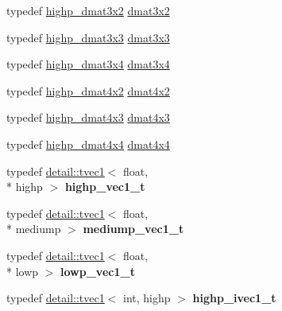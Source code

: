 \begin{DoxyCompactItemize}
\item 
typedef \hyperlink{group__core__precision_gac956fe6b946f0ccee78367ccd5427351}{highp\-\_\-dmat3x2} \hyperlink{group__core__types_ga2db259d2e7921065c5b7d4dca9547960}{dmat3x2}
\item 
typedef \hyperlink{group__core__precision_gad7229dea82287910d88e6e8566e39fc7}{highp\-\_\-dmat3x3} \hyperlink{group__core__types_gaf3c29c4f75a448f308463e75ca2efd4c}{dmat3x3}
\item 
typedef \hyperlink{group__core__precision_gaff199c8d04a8edb92ed43283e8694c59}{highp\-\_\-dmat3x4} \hyperlink{group__core__types_ga19e745a83cba85f57afa1232276dcc96}{dmat3x4}
\item 
typedef \hyperlink{group__core__precision_gaa4fb1ed350a6cd053abb9b093d13ce0d}{highp\-\_\-dmat4x2} \hyperlink{group__core__types_gab3d51ce41e6f0aa267d3e185cee09c44}{dmat4x2}
\item 
typedef \hyperlink{group__core__precision_gaf8aeba0eecc5c651e0f06414b6e37754}{highp\-\_\-dmat4x3} \hyperlink{group__core__types_gaa4a157ac183c5bd5dcbd555a94b1b505}{dmat4x3}
\item 
typedef \hyperlink{group__core__precision_ga1c0a2edbde597b59e9005691a224b208}{highp\-\_\-dmat4x4} \hyperlink{group__core__types_ga54d90d4b902d93638b906571af215bb1}{dmat4x4}
\item 
\hypertarget{namespaceglm_aa500b77d9369f9121bdd014d0e64c4f2}{typedef \hyperlink{structglm_1_1detail_1_1tvec1}{detail\-::tvec1}$<$ float, \\*
highp $>$ {\bfseries highp\-\_\-vec1\-\_\-t}}\label{namespaceglm_aa500b77d9369f9121bdd014d0e64c4f2}

\item 
\hypertarget{namespaceglm_a34591cc7729d24d31e7c1af9ab86d8be}{typedef \hyperlink{structglm_1_1detail_1_1tvec1}{detail\-::tvec1}$<$ float, \\*
mediump $>$ {\bfseries mediump\-\_\-vec1\-\_\-t}}\label{namespaceglm_a34591cc7729d24d31e7c1af9ab86d8be}

\item 
\hypertarget{namespaceglm_a6f4858c888bac87e7fbae4addee5719b}{typedef \hyperlink{structglm_1_1detail_1_1tvec1}{detail\-::tvec1}$<$ float, \\*
lowp $>$ {\bfseries lowp\-\_\-vec1\-\_\-t}}\label{namespaceglm_a6f4858c888bac87e7fbae4addee5719b}

\item 
\hypertarget{namespaceglm_a3927b4c7e92eb102463facebfe2c0e0d}{typedef \hyperlink{structglm_1_1detail_1_1tvec1}{detail\-::tvec1}$<$ int, highp $>$ {\bfseries highp\-\_\-ivec1\-\_\-t}}\label{namespaceglm_a3927b4c7e92eb102463facebfe2c0e0d}


\end{DoxyCompactItemize}
